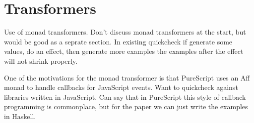 \section{Transformers}

Use of monad transformers. Don't discuss monad transformers at the start, but would be good as a seprate section. In existing quickcheck if generate some values, do an effect, then generate more examples the examples after the effect will not shrink properly.

One of the motivations for the monad transformer is that PureScript uses an Aff monad to handle callbacks for JavaScript events. Want to quickcheck against libraries written in JavaScript. Can say that in PureScript this style of callback programming is commonplace, but for the paper we can just write the examples in Haskell.

